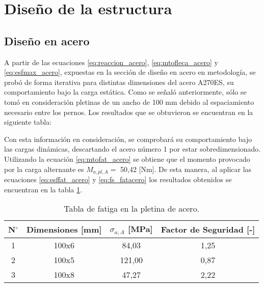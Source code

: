\section{Diseño de la estructura}
\subsection{Diseño en acero}
A partir de las ecuaciones \ref{eq:reaccion_acero}, \ref{eq:mtofleca_acero} y \ref{eq:esfmax_acero}, expuestas en la sección de diseño en acero en metodología, se probó de forma iterativa para distintas dimensiones del acero A270ES, su comportamiento bajo la carga estática. Como se señaló anteriormente, sólo se tomó en consideración pletinas de un ancho de 100 mm debido al espaciamiento necesario entre los pernos. Los resultados que se obtuvieron se encuentran en la siguiente tabla:

\begin{table}[h]
\centering
{}
\caption{Tabla aceros}
\label{tab:itest_acero}
\end{table}

Con esta información en consideración, se comprobará su comportamiento bajo las cargas dinámicas, descartando el acero número 1 por estar sobredimensionado. Utilizando la ecuación \ref{eq:mtofat_acero} se obtiene que el momento provocado por la carga alternante es $M_{a,pl,A} =$ 50,42 [Nm]. De esta manera, al aplicar las ecuaciones \ref{eq:esffat_acero} y \ref{eq:fs_fatacero} los resultados obtenidos se encuentran en la tabla \ref{tab:itfat_acero}.

\begin{table}[h]
\centering
\begin{tabular}{@{}cccc@{}}
\toprule
N$^{\circ}$ & Dimensiones [mm] & $\sigma_{a,A}$ [MPa] & Factor de Seguridad [-] \\ \midrule
1 & 100x6 & 84,03 & 1,25 \\
2 & 100x5 & 121,00 & 0,87 \\
3 & 100x8 & 47,27 & 2,22 \\ \bottomrule
\end{tabular}
\caption{Tabla de fatiga en la pletina de acero.}
\label{tab:itfat_acero}
\end{table}

